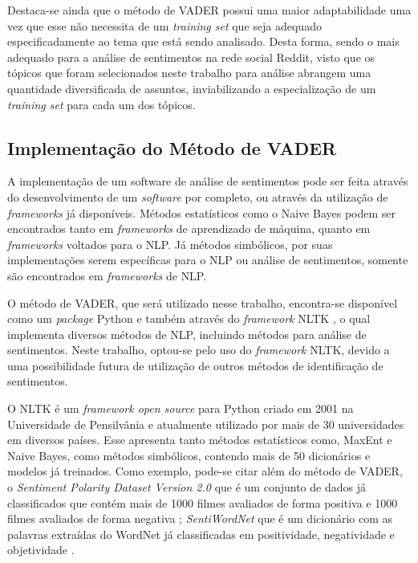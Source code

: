 Destaca-se ainda que o método de \ac{VADER} possui uma maior
adaptabilidade uma vez que esse não necessita de um \textit{training set}
que seja adequado especificadamente ao tema que está sendo analisado. Desta
forma, sendo o mais adequado para a análise de sentimentos na rede social
Reddit, visto que os tópicos que foram selecionados neste trabalho para análise
abrangem uma quantidade diversificada de assuntos, inviabilizando a
especialização de um \textit{training set} para cada um dos tópicos.

\subsection{Implementação do Método de \ac{VADER}}

A implementação de um software de análise de sentimentos pode ser feita através
do desenvolvimento de um \textit{software} por completo, ou através da
utilização de \textit{frameworks} já disponíveis.
Métodos estatísticos como o Naive Bayes podem ser encontrados tanto em
\textit{frameworks} de aprendizado de máquina, quanto em \textit{frameworks}
voltados para o \ac{NLP}.
Já métodos simbólicos, por suas implementações serem específicas para o
\ac{NLP} ou análise de sentimentos, somente são encontrados em
\textit{frameworks} de \ac{NLP}.

O método de \ac{VADER}, que será utilizado nesse trabalho, encontra-se
disponível como um \textit{package} Python e também através do \textit{framework} \ac{NLTK} \cite{Loper:2002:NNL:1118108.1118117}, o qual
implementa diversos métodos de \ac{NLP}, incluindo métodos para análise de
sentimentos. Neste trabalho, optou-se pelo uso do \textit{framework} \ac{NLTK},
devido a uma possibilidade futura de utilização de outros métodos de
identificação de sentimentos.

O \ac{NLTK} é um \textit{framework open source} para Python
criado em 2001 na Universidade de Pensilvânia e atualmente utilizado por mais de
30 universidades em diversos
países\cite{nltk}.
Esse apresenta tanto métodos estatísticos como, \ac{MaxEnt} e Naive Bayes, como
métodos simbólicos, contendo mais de 50 dicionários e modelos já treinados.
Como exemplo, pode-se citar além do método de \ac{VADER}, o \textit{Sentiment
Polarity Dataset Version 2.0} que é um conjunto de dados já classificados que
contém mais de 1000 filmes avaliados de forma positiva e 1000 filmes avaliados
de forma negativa \cite{Pang:2002:TUS:1118693.1118704}; \textit{SentiWordNet}
que é um dicionário com as palavras extraídas do WordNet já classificadas em
positividade, negatividade e objetividade \cite{Esuli2006sentiwordnet}.
